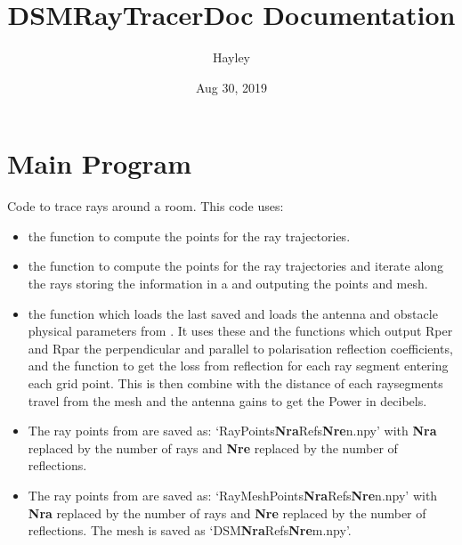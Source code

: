 \documentclass[letterpaper,10pt,english]{sphinxmanual}
\title{DSMRayTracerDoc Documentation}
\date{Aug 30, 2019}
\author{Hayley}
\begin{document}
\maketitle
\tableofcontents
{}\label{index::doc}



\chapter{Main Program}
\label{index:welcome-to-dsmraytracerdoc-s-documentation}\label{index:main-program}\label{index:module-RayTracerMainProgram}
Code to trace rays around a room. This code uses:
\begin{itemize}
\item {} 
the function {\hyperref[index:RayTracerMainProgram.RayTracer]{}} to compute the points for   the ray trajectories.

\item {} 
the function {\hyperref[index:RayTracerMainProgram.MeshProgram]{}} to compute the points for   the ray trajectories and iterate along the rays storing the   information in a {\hyperref[index:DictionarySparseMatrix.DS]{}} and outputing   the points and mesh.

\item {} 
the function {\hyperref[index:RayTracerMainProgram.power_grid]{}} which loads the last saved   and loads the antenna and obstacle physical parameters from   {\hyperref[index:ParameterInput.ObstacleCoefficients]{}}. It uses these and   the functions {\hyperref[index:RayTracerMainProgram.RefCoefComputation]{}} which output Rper   and Rpar the perpendicular and parallel to polarisation reflection   coefficients, and the function {\hyperref[index:RayTracerMainProgram.RefCombine]{}} to   get the loss from reflection for each ray segment entering each grid   point. This is then combine with the distance of each raysegments   travel from the mesh and the antenna gains to get the Power in   decibels.

\item {} 
The ray points from {\hyperref[index:RayTracerMainProgram.RayTracer]{}} are saved as:
`RayPoints\textbf{Nra}Refs\textbf{Nre}n.npy' with \textbf{Nra} replaced by the     number of rays and \textbf{Nre} replaced by the number of reflections.

\item {} 
The ray points from {\hyperref[index:RayTracerMainProgram.MeshProgram]{}} are saved as:
`RayMeshPoints\textbf{Nra}Refs\textbf{Nre}n.npy' with \textbf{Nra} replaced     by the     number of rays and \textbf{Nre} replaced by the number of reflections.     The mesh is saved as `DSM\textbf{Nra}Refs\textbf{Nre}m.npy'.

\end{itemize}
\end{document}
